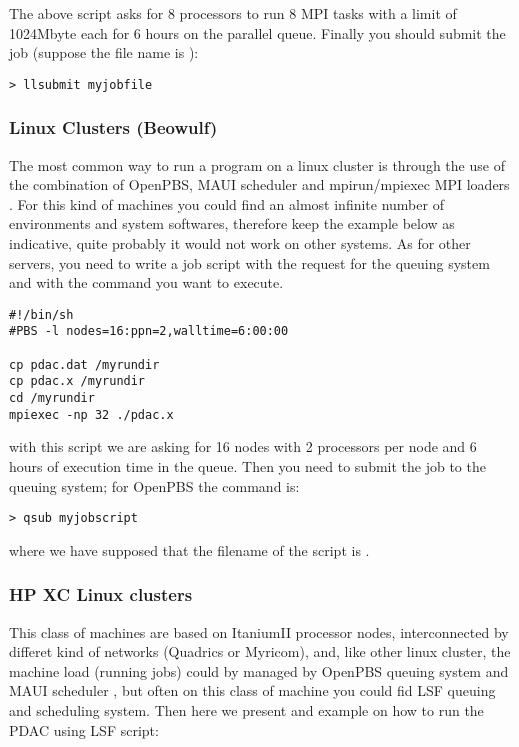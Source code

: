 The above script asks for 8 processors to run 8 MPI tasks
with a limit of 1024Mbyte each for 6 hours on the parallel queue.
Finally you should submit the job (suppose the file name is ):

\begin{verbatim}
> llsubmit myjobfile
\end{verbatim}

\subsubsection{Linux Clusters (Beowulf)}

The most common way to run a program on a linux cluster 
is through the use of the combination of OpenPBS, MAUI scheduler
and mpirun/mpiexec MPI loaders .
For this kind of machines you could find an almost infinite number
of environments and system softwares, therefore keep the example below
as indicative, quite probably it would not work on other systems. 
As for other servers, you need to write a job script with
the request for the queuing system and with the command you 
want to execute.

\begin{verbatim}
#!/bin/sh
#PBS -l nodes=16:ppn=2,walltime=6:00:00

cp pdac.dat /myrundir
cp pdac.x /myrundir
cd /myrundir
mpiexec -np 32 ./pdac.x
\end{verbatim}

with this script we are asking for 16 nodes with 2 processors per node
and 6 hours of execution time in the queue. Then you need to
submit the job to the queuing system; for OpenPBS the command is:

\begin{verbatim}
> qsub myjobscript
\end{verbatim}

where we have supposed that the filename of the script is
.

\subsubsection{HP XC Linux clusters}

This class of machines are based on ItaniumII processor nodes,
interconnected by differet kind of networks (Quadrics or Myricom),
and, like other linux cluster, the machine load (running jobs)
could by managed by OpenPBS queuing system and MAUI scheduler , 
but often on this class of machine you could fid LSF queuing and
scheduling system. 
Then here we present and example on how to run the PDAC using
LSF script:

